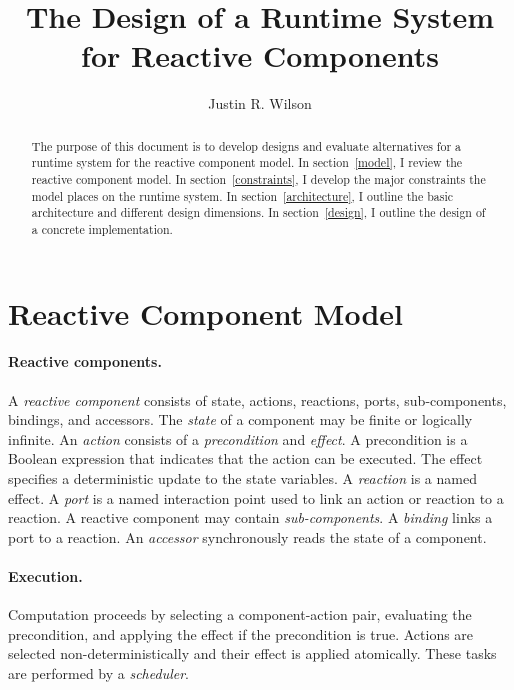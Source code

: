 \documentclass[letterpaper]{article}
\title{The Design of a Runtime System for Reactive Components}
\author{Justin R. Wilson}
\date{}
\theoremstyle{definition} \newtheorem{constraint}{Constraint}
\begin{document}
\maketitle

\begin{abstract}
The purpose of this document is to develop designs and evaluate alternatives for a runtime system for the reactive component model.
In section~\ref{model}, I review the reactive component model.
In section~\ref{constraints}, I develop the major constraints the model places on the runtime system.
In section~\ref{architecture}, I outline the basic architecture and different design dimensions.
In section~\ref{design}, I outline the design of a concrete implementation.
\end{abstract}

\section{Reactive Component Model\label{model}}

\paragraph{Reactive components.}
A \emph{reactive component} consists of state, actions, reactions, ports, sub-components, bindings, and accessors.
The \emph{state} of a component may be finite or logically infinite.
An \emph{action} consists of a \emph{precondition} and \emph{effect}.
A precondition is a Boolean expression that indicates that the action can be executed.
The effect specifies a deterministic update to the state variables.
A \emph{reaction} is a named effect.
A \emph{port} is a named interaction point used to link an action or reaction to a reaction.
A reactive component may contain \emph{sub-components}.
A \emph{binding} links a port to a reaction.
An \emph{accessor} synchronously reads the state of a component.

\paragraph{Execution.}
Computation proceeds by selecting a component-action pair, evaluating the precondition, and applying the effect if the precondition is true.
Actions are selected non-deterministically and their effect is applied atomically.
These tasks are performed by a \emph{scheduler}.
\end{document}
